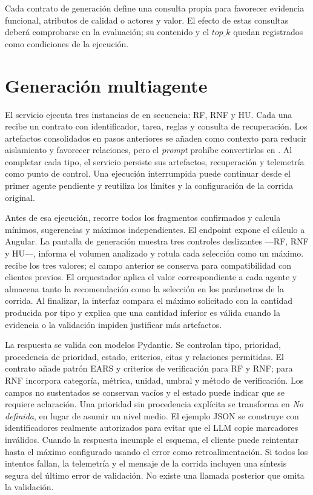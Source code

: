 Cada contrato de generación define una consulta propia para favorecer evidencia funcional, atributos de calidad o actores y valor. El efecto de estas consultas deberá comprobarse en la evaluación; su contenido y el \(top\_k\) quedan registrados como condiciones de la ejecución.

\section{Generación multiagente}

El servicio ejecuta tres instancias de  en secuencia: RF, RNF y HU. Cada una recibe un contrato con identificador, tarea, reglas y consulta de recuperación. Los artefactos consolidados en pasos anteriores se añaden como contexto para reducir aislamiento y favorecer relaciones, pero el \emph{prompt} prohíbe convertirlos en . Al completar cada tipo, el servicio persiste sus artefactos, recuperación y telemetría como punto de control. Una ejecución interrumpida puede continuar desde el primer agente pendiente y reutiliza los límites y la configuración de la corrida original.

Antes de esa ejecución,  recorre todos los fragmentos confirmados y calcula mínimos, sugerencias y máximos independientes. El endpoint  expone el cálculo a Angular. La pantalla de generación muestra tres controles deslizantes ---RF, RNF y HU---, informa el volumen analizado y rotula cada selección como un máximo.  recibe los tres valores; el campo anterior  se conserva para compatibilidad con clientes previos. El orquestador aplica el valor correspondiente a cada agente y almacena tanto la recomendación como la selección en los parámetros de la corrida. Al finalizar, la interfaz compara el máximo solicitado con la cantidad producida por tipo y explica que una cantidad inferior es válida cuando la evidencia o la validación impiden justificar más artefactos.

La respuesta se valida con modelos Pydantic. Se controlan tipo, prioridad, procedencia de prioridad, estado, criterios, citas y relaciones permitidas. El contrato añade patrón EARS y criterios de verificación para RF y RNF; para RNF incorpora categoría, métrica, unidad, umbral y método de verificación. Los campos no sustentados se conservan vacíos y el estado puede indicar que se requiere aclaración. Una prioridad sin procedencia explícita se transforma en \emph{No definida}, en lugar de asumir un nivel medio. El ejemplo JSON se construye con identificadores realmente autorizados para evitar que el LLM copie marcadores inválidos. Cuando la respuesta incumple el esquema, el cliente puede reintentar hasta el máximo configurado usando el error como retroalimentación. Si todos los intentos fallan, la telemetría y el mensaje de la corrida incluyen una síntesis segura del último error de validación. No existe una llamada posterior que omita la validación.

